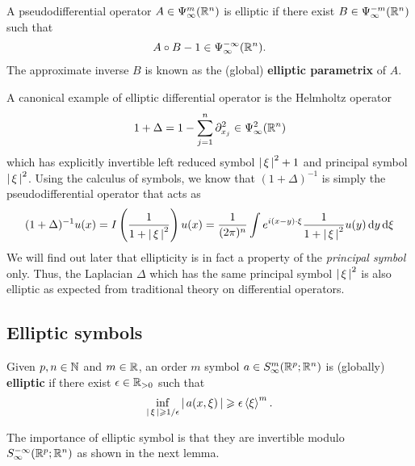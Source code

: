\documentclass[12pt]{article}
\begin{document}
\begin{fdefinition}
    A pseudodifferential operator $A \in \Psi^{m}_{\infty}(\R^n)$ is elliptic if there exist $B \in \Psi^{-m}_{\infty}(\R^n)$ such that 
    \begin{align*}
    A \circ B - 1 \in \Psi^{-\infty}_{\infty}(\R^n). 
    \end{align*}
    The approximate inverse $B$ is known as the (global) \textbf{elliptic parametrix} of $A$. 
\end{fdefinition}

A canonical example of elliptic differential operator is the Helmholtz operator 
\begin{align*}
1  + \Delta = 1 - \sum_{j = 1}^ n \p_{x_j}^2 \in \Psi^{2}_{\infty}(\R^n)
\end{align*}
which has explicitly invertible left reduced symbol $\abs{\xi}^2 + 1$ and principal symbol $\abs{\xi}^2$. Using the calculus of symbols, we know that $(1 + \Delta)^{-1}$ is simply the pseudodifferential operator that acts as 
\begin{align*}
(1 + \Delta)^{-1} u(x) = I\brac{\frac{1}{1 + \abs{\xi}^2} } u(x) = \frac{1}{(2\pi)^n} \int e^{i(x - y) \cdot \xi} \frac{1}{1 + \abs{\xi}^2} u(y) \d[y] \d[\xi]
\end{align*}
We will find out later that ellipticity is in fact a property of the \textit{principal symbol} only. Thus, the Laplacian $\Delta$ which has the same principal symbol $\abs{\xi}^2$ is also elliptic as expected from traditional theory on differential operators. 


\subsection{Elliptic symbols}
\begin{fdefinition}
    Given $p, n \in \N$ and $m \in \R$, an order $m$ symbol $a \in S^m_\infty(\R^p; \R^n)$ is (globally) \textbf{elliptic} if there exist $\epsilon \in \R_{>0}$ such that 
    \[
    \inf_{\abs{\xi} \geq 1/\epsilon} \abs{a(x, \xi)} \geq \epsilon \sym[\xi]^m. 
    \]
\end{fdefinition}

The importance of elliptic symbol is that they are invertible modulo $S^{-\infty}_\infty(\R^p; \R^n)$ as shown in the next lemma. 
\end{document}
